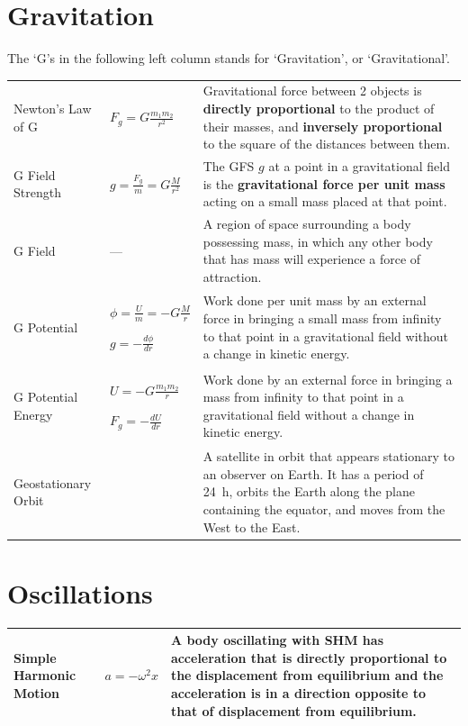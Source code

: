 \documentclass[a4paper,11pt]{article}
\begin{document}
	\section{Gravitation}
	The `G's in the following left column stands for `Gravitation', or `Gravitational'.
		\begin{center}
			\renewcommand{\arraystretch}{1.6}
			\begin{tabular}{@{} l l p{7.8cm} @{}}
				\toprule
				Newton's Law of G & $\displaystyle F_g = G\frac{m_1 m_2}{r^2}$ & Gravitational force between 2 objects is \textbf{directly proportional} to the product of their masses, and \textbf{inversely proportional} to the square of the distances between them. \\
				G Field Strength & $\displaystyle g = \frac{F_g}{m} = G\frac{M}{r^2}$ & The GFS $g$ at a point in a gravitational field is the \textbf{gravitational force per unit mass} acting on a small mass placed at that point. \\
				G Field & --- & A region of space surrounding a body possessing mass, in which any other body that has mass will experience a force of attraction.\\
				G Potential & \multicolumn{1}{p{2.8cm}}{$\displaystyle \phi = \frac{U}{m} = -G \frac{M}{r}$ \par \vspace{1.5mm} $\displaystyle g=-\frac{d\phi}{dr}$\vspace{1.5mm}} & Work done per unit mass by an external force in bringing a small mass from infinity to that point in a gravitational field without a change in kinetic energy.\\
				G Potential Energy & \multicolumn{1}{p{2.6cm}}{$\displaystyle U = -G \frac{m_1 m_2}{r}$ \par \vspace{2mm} $\displaystyle F_g=-\frac{dU}{dr}$} & Work done by an external force in bringing a mass from infinity to that point in a gravitational field without a change in kinetic energy. \\
				Geostationary Orbit & & A satellite in orbit that appears stationary to an observer on Earth. It has a period of \SI{24}{\hour}, orbits the Earth along the plane containing the equator, and moves from the West to the East.\\
				\bottomrule
			\end{tabular}
		\end{center}
	\newpage
	\section{Oscillations}
		\begin{center}
			\renewcommand{\arraystretch}{1.2}
			\begin{tabular}{@{} l l p{8cm} @{}}
				\toprule
				Simple Harmonic Motion & $a=-\omega^2x$ & A body \textbf{oscillating} with SHM has \textbf{acceleration} that is \textbf{directly proportional} to the \textbf{displacement from equilibrium} and the acceleration is in a \textbf{direction opposite} to that of displacement from equilibrium. \\
				\bottomrule
			\end{tabular}
		\end{center}
\end{document}
